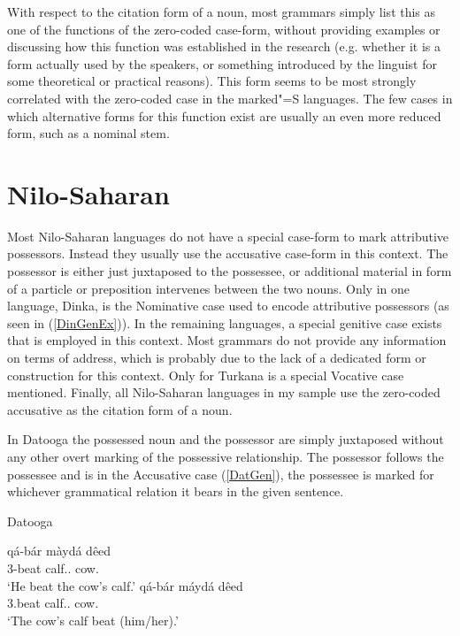 With respect to the citation form of a noun, most grammars simply list this as one of the functions of the zero-coded case-form, without providing examples or discussing how this function was established in the research (e.g. whether it is a form actually used by the speakers, or something introduced by the linguist for some theoretical or practical reasons). 
This form seems to be most strongly correlated with the zero-coded case in the marked"=S languages. 
The few cases in which alternative forms for this function exist are usually an even more reduced form, such as a nominal stem.

\section{Nilo-Saharan}\label{ExtraNilo}

Most Nilo-Saharan languages do not have a special case-form to mark attributive possessors.
Instead they usually use the accusative case-form in this context. 
The possessor is either just juxtaposed to the possessee, or additional material in form of a particle or preposition intervenes between the two nouns. 
Only in one language, Dinka, is the Nominative case used to encode attributive possessors (as seen in (\ref{DinGenEx})). 
In the remaining languages, a special genitive case exists that is employed in this context.
Most grammars do not provide any information on terms of address, which is probably due to the lack of a dedicated form or construction for this context.
Only for Turkana is a special Vocative case mentioned. 
Finally, all Nilo-Saharan languages in my sample use the zero-coded accusative as the citation form of a noun.



In Datooga the possessed noun and the possessor are simply juxtaposed without any other overt marking of the possessive relationship. 
The possessor follows the possessee and is in the Accusative case (\ref{DatGen}), the possessee is marked for whichever grammatical relation it bears in the given sentence.

\begin{exe}\ex\label{DatGen} {Datooga} \citep[Nilotic; Tanzania; ][178, 179]{Kiessling:2007}\nopagebreak[4]
\begin{xlist}
\ex\gll q\'a-b\'ar m\`ayd\'a d\^eed\\
3\sg{}-beat calf.\acc{}.\cs{} cow.\acc{}\\
`He beat the cow's calf.'
\ex\gll q\'a-b\'ar m\'ayd\'a d\^eed\\
3\sg{}.beat calf.\nom{}.\cs{} cow.\acc{}\\
`The cow's calf beat (him/her).'
\end{xlist}
\end{exe}

